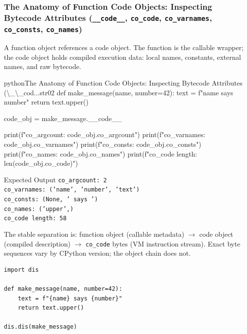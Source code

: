 \documentclass[a4paper,twoside]{report}
\begin{document}
\subsubsection{The Anatomy of Function Code Objects: Inspecting Bytecode Attributes (\texttt{\_\_code\_\_}, \texttt{co\_code}, \texttt{co\_varnames}, \texttt{co\_consts}, \texttt{co\_names})}

A function object references a code object. The function is the callable wrapper; the code object holds compiled execution data: local names, constants, external names, and raw bytecode.

\begin{codebox}[]{python}{The Anatomy of Function Code Objects: Inspecting Bytecode Attributes (\textbackslash{}\_\textbackslash{}\_cod...}{str02}
def make_message(name, number=42):
    text = f"{name} says {number}"
    return text.upper()

code_obj = make_message.__code__

print(f"co_argcount:    {code_obj.co_argcount}")
print(f"co_varnames:    {code_obj.co_varnames}")
print(f"co_consts:      {code_obj.co_consts}")
print(f"co_names:       {code_obj.co_names}")
print(f"co_code length: {len(code_obj.co_code)}")
\end{codebox}


\begin{iobox}{Expected Output}
\texttt{co\_argcount:    2} \\
\texttt{co\_varnames:    ('name', 'number', 'text')} \\
\texttt{co\_consts:      (None, ' says ')} \\
\texttt{co\_names:       ('upper',)} \\
\texttt{co\_code length: 58} \\
\end{iobox}




The stable separation is: function object (callable metadata) $\rightarrow$ code object (compiled description) $\rightarrow$ \texttt{co\_code} bytes (VM instruction stream). Exact byte sequences vary by CPython version; the object chain does not.

\begin{verbatim}
import dis

def make_message(name, number=42):
    text = f"{name} says {number}"
    return text.upper()

dis.dis(make_message)
\end{verbatim}
\end{document}
